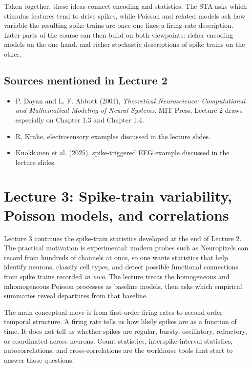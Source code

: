 \documentclass[11pt]{article}
\begin{document}
Taken together, these ideas connect encoding and statistics. The STA asks which stimulus features tend to drive spikes, while Poisson and related models ask how variable the resulting spike trains are once one fixes a firing-rate description. Later parts of the course can then build on both viewpoints: richer encoding models on the one hand, and richer stochastic descriptions of spike trains on the other.

\subsection*{Sources mentioned in Lecture 2}

\begin{itemize}
    \item P. Dayan and L. F. Abbott (2001), \emph{Theoretical Neuroscience: Computational and Mathematical Modeling of Neural Systems}. MIT Press. Lecture 2 draws especially on Chapter 1.3 and Chapter 1.4.
    \item R. Krahe, electrosensory examples discussed in the lecture slides.
    \item Kuokkanen et al. (2025), spike-triggered EEG example discussed in the lecture slides.
\end{itemize}

\clearpage
\section{Lecture 3: Spike-train variability, Poisson models, and correlations}

Lecture 3 continues the spike-train statistics developed at the end of Lecture 2. The practical motivation is experimental: modern probes such as Neuropixels can record from hundreds of channels at once, so one wants statistics that help identify neurons, classify cell types, and detect possible functional connections from spike trains recorded \emph{in vivo}. The lecture treats the homogeneous and inhomogeneous Poisson processes as baseline models, then asks which empirical summaries reveal departures from that baseline.

The main conceptual move is from first-order firing rates to second-order temporal structure. A firing rate tells us how likely spikes are as a function of time. It does not tell us whether spikes are regular, bursty, oscillatory, refractory, or coordinated across neurons. Count statistics, interspike-interval statistics, autocorrelations, and cross-correlations are the workhorse tools that start to answer those questions.
\end{document}
